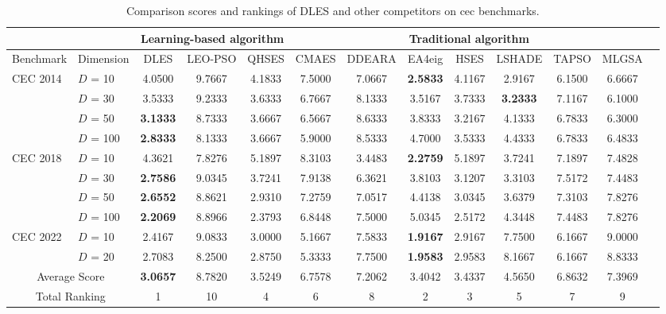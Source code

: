 \documentclass[journal, onecolumn]{IEEEtran}
\begin{document}
\begin{table}[t]
	\centering
	\caption{Comparison scores and rankings of DLES and other competitors on cec benchmarks.}
	\vspace{-2mm}
	\label{frideall}
		\begin{tabular}{l|l|ccc|cccccccc}	
			\hline	
			\multicolumn{2}{c|}{ } & \multicolumn{3}{c|}{Learning-based algorithm} & \multicolumn{7}{c}{ Traditional algorithm}\\ 
			\hline																				
			Benchmark	&	Dimension	&	DLES	&	LEO-PSO	&	QHSES	&	CMAES	&	DDEARA	&	EA4eig	&	HSES	&	LSHADE	&	TAPSO	&	MLGSA	\\
			\hline																							
			\multirow{4}{*}{CEC 2014}	& 	$D$ = 10  	&	4.0500 	&	9.7667 	&	4.1833 	&	7.5000 	&	7.0667 	&	\textbf{2.5833}	&	4.1167 	&	2.9167 	&	6.1500 	&	6.6667 	\\
			& 	$D$ = 30 	&	3.5333 	&	9.2333 	&	3.6333 	&	6.7667 	&	8.1333 	&	3.5167 	&	3.7333 	&	\textbf{3.2333}	&	7.1167 	&	6.1000 	\\
			& 	$D$ = 50 	&	\textbf{3.1333}	&	8.7333 	&	3.6667 	&	6.5667 	&	8.6333 	&	3.8333 	&	3.2167 	&	4.1333 	&	6.7833 	&	6.3000 	\\
			& 	$D$ = 100 	&	\textbf{2.8333}	&	8.1333 	&	3.6667 	&	5.9000 	&	8.5333 	&	4.7000 	&	3.5333 	&	4.4333 	&	6.7833 	&	6.4833 	\\
			\hline																							
			\multirow{4}{*}{CEC 2018}	& 	$D$ = 10  	&	4.3621 	&	7.8276 	&	5.1897 	&	8.3103 	&	3.4483 	&	\textbf{2.2759}	&	5.1897 	&	3.7241 	&	7.1897 	&	7.4828 	\\
			& 	$D$ = 30 	&	\textbf{2.7586}	&	9.0345 	&	3.7241 	&	7.9138 	&	6.3621 	&	3.8103 	&	3.1207 	&	3.3103 	&	7.5172 	&	7.4483 	\\
			& 	$D$ = 50 	&	\textbf{2.6552}	&	8.8621 	&	2.9310 	&	7.2759 	&	7.0517 	&	4.4138 	&	3.0345 	&	3.6379 	&	7.3103 	&	7.8276 	\\
			& 	$D$ = 100 	&	\textbf{2.2069}	&	8.8966 	&	2.3793 	&	6.8448 	&	7.5000 	&	5.0345 	&	2.5172 	&	4.3448 	&	7.4483 	&	7.8276 	\\
			\hline																							
			\multirow{2}{*}{CEC 2022}	& 	$D$ = 10  	&	2.4167 	&	9.0833 	&	3.0000 	&	5.1667 	&	7.5833 	&	\textbf{1.9167}	&	2.9167 	&	7.7500 	&	6.1667 	&	9.0000 	\\
			& 	$D$ = 20 	&	2.7083 	&	8.2500 	&	2.8750 	&	5.3333 	&	7.7500 	&	\textbf{1.9583}	&	2.9583 	&	8.1667 	&	6.1667 	&	8.8333 	\\
			\hline																							
			\multicolumn{2}{c|}{Average Score}			& 	\textbf{3.0657}	&	8.7820 	&	3.5249 	&	6.7578 	&	7.2062 	&	3.4042 	&	3.4337 	&	4.5650 	&	6.8632 	&	7.3969 	\\
			\multicolumn{2}{c|}{Total Ranking}			&	1	&	10	&	4	&	6	&	8	&	2	&	3	&	5	&	7	&	9	\\
			\hline																
		\end{tabular}
		\vspace{-2mm}
\end{table}
\end{document}
